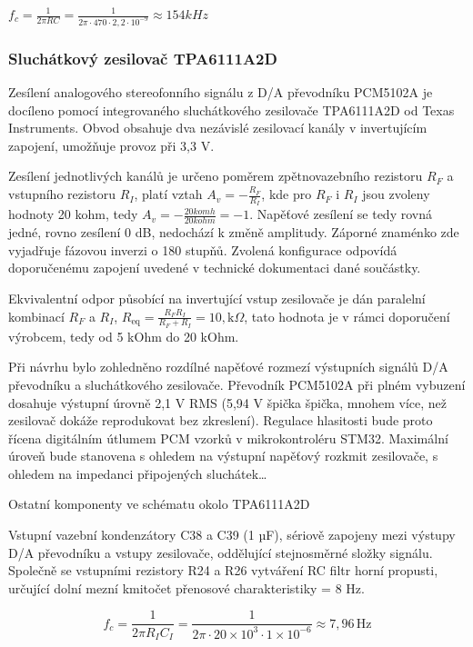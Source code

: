 $ f_c = \frac{1}{2\pi R C} = \frac{1}{2\pi \cdot 470 \cdot 2{,}2 \cdot 10^{-9}} \approx 154 kHz$

\subsubsection{Sluchátkový zesilovač TPA6111A2D}
Zesílení analogového stereofonního signálu z D/A převodníku PCM5102A je docíleno pomocí integrovaného sluchátkového zesilovače TPA6111A2D od Texas Instruments. Obvod obsahuje dva nezávislé zesilovací kanály v invertujícím zapojení, umožňuje provoz při 3,3 V. 

Zesílení jednotlivých kanálů je určeno poměrem zpětnovazebního rezistoru $R_F$ a vstupního rezistoru $R_I$, platí vztah 
$A_v=-\frac{R_F}{R_I}$, kde pro $R_F$ i $R_I$ jsou zvoleny hodnoty 20 kohm, tedy $A_v=-\frac{20 komh}{20 kohm}=-1$. Napěťové zesílení se tedy rovná jedné, rovno zesílení 0 dB, nedochází k změně amplitudy. Záporné znaménko zde vyjadřuje fázovou inverzi o 180 stupňů. Zvolená konfigurace odpovídá doporučenému zapojení uvedené v technické dokumentaci dané součástky.

Ekvivalentní odpor působící na invertující vstup zesilovače je dán paralelní kombinací $R_F$ a $R_I$, $R_{\mathrm{eq}}=\frac{R_F R_I}{R_F+R_I}
=10,\mathrm{k}\Omega$, tato hodnota je v rámci doporučení výrobcem, tedy od 5 kOhm do 20 kOhm.

Při návrhu bylo zohledněno rozdílné napěťové rozmezí výstupních signálů D/A převodníku a sluchátkového zesilovače. Převodník PCM5102A při plném vybuzení dosahuje výstupní úrovně 2,1 V RMS (5,94 V špička špička, mnohem více, než zesilovač dokáže reprodukovat bez zkreslení). Regulace hlasitosti bude proto řícena digitálním útlumem PCM vzorků v mikrokontroléru STM32. Maximální úroveň bude stanovena s ohledem na výstupní napěťový rozkmit zesilovače, s ohledem na impedanci připojených sluchátek\dots

Ostatní komponenty ve schématu okolo TPA6111A2D

Vstupní vazební kondenzátory C38 a C39 (1 µF), sériově zapojeny mezi výstupy D/A převodníku a vstupy zesilovače, oddělující stejnosměrné složky signálu. Společně se vstupními rezistory R24 a R26 vytváření RC filtr horní propusti, určující dolní mezní kmitočet přenosové charakteristiky = 8 Hz.

\begin{equation}
    f_c = \frac{1}{2\pi R_I C_I}
    = \frac{1}{2\pi \cdot 20 \times 10^3 \cdot 1 \times 10^{-6}}
    \approx 7{,}96\,\mathrm{Hz}
    \label{eq:mezni_frekvence_vstup}
\end{equation}

